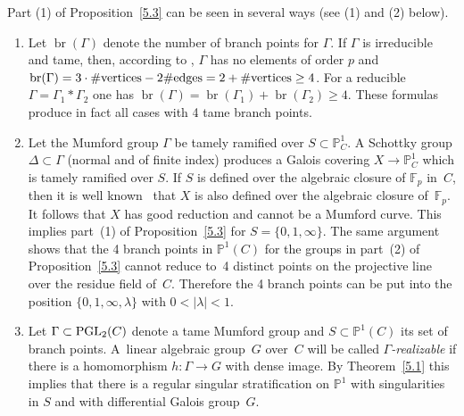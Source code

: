 \documentclass[10pt,a4paper]{amsart}
\numberwithin{equation}{section}
\begin{document}
\begin{Comments}\label{5.4} Part (1) of Proposition~\ref{5.3} can be seen in several ways (see (1) and (2) below).
\begin{enumerate}\itemsep=0pt
\item[(1)] Let $\operatorname{br}(\Gamma)$ denote the number of branch points for $\Gamma$. If $\Gamma$ is irreducible and tame, then, according to \cite[Theorem~3.1 and Section~9.1]{Vo-vdP}, $\Gamma$ has no elements of order $p$ and $\operatorname{br}(\Gamma)=3\cdot \# {\rm vertices}-2\#{\rm edges}=2+\# {\rm vertices}\geq 4$. For a reducible $\Gamma=\Gamma_1\ast \Gamma_2$ one has $\operatorname{br}(\Gamma)=\operatorname{br}(\Gamma_1)+\operatorname{br}(\Gamma_2)\geq 4$. These formulas produce in fact all cases with 4 tame branch points.
\item[(2)] Let the Mumford group $\Gamma$ be tamely ramified over $S\subset \mathbb{P}_C^1$. A Schottky group $\Delta \subset \Gamma$ (normal and of finite index) produces a Galois covering $X\rightarrow \mathbb{P}^1_C$ which is tamely ramified over $S$. If $S$ is defined over the algebraic closure of $\mathbb{F}_p$ in~$C$, then it is well known~\cite[Expos\'e~IX]{SGA1} that $X$ is also defined over the algebraic closure of~$\mathbb{F}_p$. It follows that $X$ has good reduction and cannot be a Mumford curve. This implies part~(1) of Proposition~\ref{5.3} for $S=\{0,1,\infty\}$.
The same argument shows that the 4 branch points in $\mathbb{P}^1(C)$ for the groups in part~(2) of Proposition~\ref{5.3} cannot reduce to~4 distinct points on the projective line over the residue field of~$C$. Therefore the 4 branch points can be put into the position $\{0,1,\infty, \lambda \}$ with $0<|\lambda |<1$.

\item[(3)] Let $\Gamma\subset {\rm PGL}_2(C)$ denote a tame Mumford group and $S\subset \mathbb{P}^1(C)$ its set of branch points. A~linear algebraic group~$G$ over~$C$ will be called {\it $\Gamma$-realizable} if there is a homomorphism $h\colon \Gamma \rightarrow G$ with dense image. By Theorem~\ref{5.1} this implies that there is a regular singular stratification on $\mathbb{P}^1$ with singularities in $S$ and with differential Galois group~$G$.
\end{enumerate}
\end{Comments}
\end{document}
